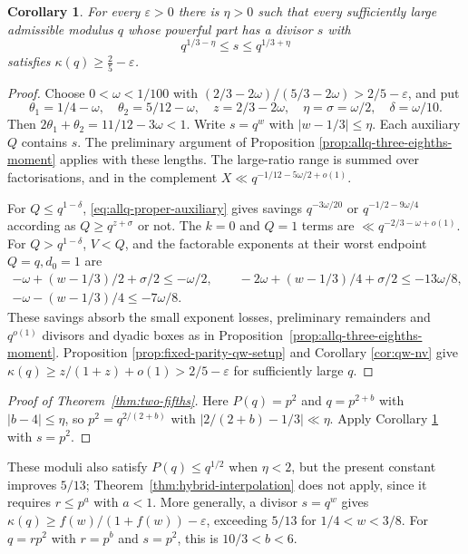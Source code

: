 \documentclass[12pt, a4paper]{amsart}
\numberwithin{equation}{section}
\newcommand{\ep}{\varepsilon}
\renewcommand{\le}{\leqslant}
\renewcommand{\ge}{\geqslant}
\theoremstyle{plain}
\newtheorem{cor}[lem]{Corollary}
\begin{document}
\begin{cor}\label{cor:third-divisor}
For every $\ep>0$ there is $\eta>0$ such that every sufficiently large admissible modulus $q$ whose powerful part has a divisor $s$ with
$$
q^{1/3-\eta}\le s\le q^{1/3+\eta}
$$
satisfies $\kappa(q)\ge\frac25-\ep$.
\end{cor}

\begin{proof}
Choose $0<\omega<1/100$ with $(2/3-2\omega)/(5/3-2\omega)>2/5-\ep$, and put
$$
\theta_1=1/4-\omega,\quad
\theta_2=5/12-\omega,\quad
z=2/3-2\omega,\quad
\eta=\sigma=\omega/2,\quad
\delta=\omega/10.
$$
Then $2\theta_1+\theta_2=11/12-3\omega<1$. Write $s=q^{w}$ with $|w-1/3|\le\eta$. Each auxiliary $Q$ contains $s$. The preliminary argument of Proposition \ref{prop:allq-three-eighths-moment} applies with these lengths. The large-ratio range is summed over factorisations, and in the complement ${X\ll q^{-1/12-5\omega/2+o(1)}}$.

For $Q\le q^{1-\delta}$, \eqref{eq:allq-proper-auxiliary} gives savings $q^{-3\omega/20}$ or $q^{-1/2-9\omega/4}$ according as $Q\ge q^{z+\sigma}$ or not. The $k=0$ and $Q=1$ terms are $\ll q^{-2/3-\omega+o(1)}$. For $Q>q^{1-\delta}$, $V<Q$, and the factorable exponents at their worst endpoint $Q=q,d_0=1$ are
$$
\begin{gathered}
-\omega+(w-1/3)/2+\sigma/2\le-\omega/2,\qquad
-2\omega+(w-1/3)/4+\sigma/2\le-13\omega/8,\\
-\omega-(w-1/3)/4\le-7\omega/8.
\end{gathered}
$$
These savings absorb the small exponent losses, preliminary remainders and $q^{o(1)}$ divisors and dyadic boxes as in Proposition~\ref{prop:allq-three-eighths-moment}. Proposition \ref{prop:fixed-parity-qw-setup} and Corollary \ref{cor:qw-nv} give $\kappa(q)\ge z/(1+z)+o(1)>2/5-\ep$ for sufficiently large $q$.
\end{proof}

\begin{proof}[Proof of Theorem~\ref{thm:two-fifths}]
Here $P(q)=p^2$ and $q=p^{2+b}$ with $|b-4|\le\eta$, so $p^2=q^{2/(2+b)}$ with $|2/(2+b)-1/3|\ll\eta$. Apply Corollary \ref{cor:third-divisor} with $s=p^2$.
\end{proof}

These moduli also satisfy $P(q)\le q^{1/2}$ when $\eta<2$, but the present constant improves $5/13$; Theorem~\ref{thm:hybrid-interpolation} does not apply, since it requires $r\le p^a$ with $a<1$. More generally, a divisor $s=q^{w}$ gives $\kappa(q)\ge f(w)/(1+f(w))-\ep$, exceeding $5/13$ for $1/4<w<3/8$. For $q=rp^2$ with $r=p^{b}$ and $s=p^2$, this is $10/3<b<6$.
\end{document}
